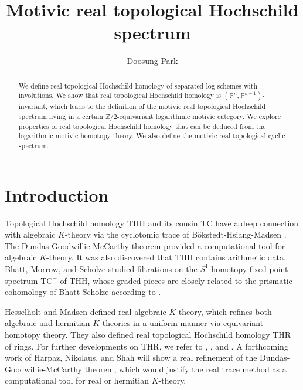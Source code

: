 \documentclass[10pt]{amsart}
\theoremstyle{definition}
\theoremstyle{remark}
\numberwithin{equation}{section}
\renewcommand{\P}{\mathbb{P}}
\newcommand{\THH}{\mathrm{THH}}
\newcommand{\THR}{\mathrm{THR}}
\newcommand{\TC}{\mathrm{TC}}
\newcommand{\Ztwo}{{\mathbb{Z}/2}}
\begin{document}
\author{Doosung Park}
\address{Bergische Universit{\"a}t Wuppertal,
Fakult{\"a}t Mathematik und Naturwissenschaften
\\
Gau{\ss}strasse 20, 42119 Wuppertal, Germany}


\title{Motivic real topological Hochschild spectrum}
\begin{abstract}
We define real topological Hochschild homology of separated log schemes with involutions.
We show that real topological Hochschild homology is $(\P^n,\P^{n-1})$-invariant,
which leads to the definition of the motivic real topological Hochschild spectrum living in a certain $\Ztwo$-equivariant logarithmic motivic category.
We explore properties of real topological Hochschild homology that can be deduced from the logarithmic motivic homotopy theory.
We also define the motivic real topological cyclic spectrum.
\end{abstract}
\maketitle




\section{Introduction}


Topological Hochschild homology $\THH$ and its cousin $\TC$ have a deep connection with algebraic $K$-theory via the cyclotomic trace of B\"okstedt-Hsiang-Madsen \cite{BHM93}.
The Dundas-Goodwillie-McCarthy theorem \cite{DGM13} provided a computational tool for algebraic $K$-theory.
It was also discovered that $\THH$ contains arithmetic data.
Bhatt, Morrow, and Scholze \cite{BMS19} studied filtrations on the $S^1$-homotopy fixed point spectrum $\TC^-$ of $\THH$,
whose graded pieces are closely related to the prismatic cohomology of Bhatt-Scholze according to \cite[\S 13]{zbMATH07611906}.

\medskip

Hesselholt and Madsen \cite{HM} defined real algebraic $K$-theory,
which refines both algebraic and hermitian $K$-theories in a uniform manner via equivariant homotopy theory.
They also defined real topological Hochschild homology $\THR$ of rings.
For further developments on $\THR$,
we refer to \cite{Hog}, \cite{DMPR21}, and \cite{QS2}.
A forthcoming work of Harpaz, Nikolaus, and Shah will show a real refinement of the Dundas-Goodwillie-McCarthy theorem,
which would justify the real trace method as a computational tool for real or hermitian $K$-theory.
\end{document}
